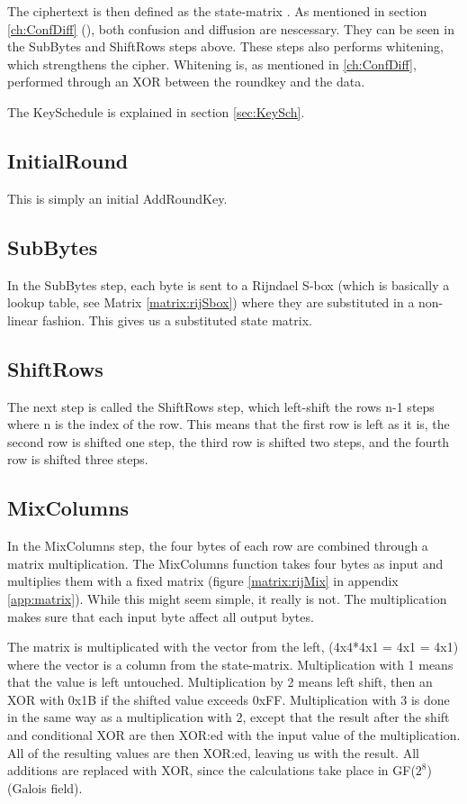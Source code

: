 The ciphertext is then defined as the state-matrix 
\citep[p. 103]{Stinson:2006}. As mentioned in section 
\ref{ch:ConfDiff} (), both confusion and diffusion 
are nescessary. They can be seen in the SubBytes and ShiftRows steps 
above. These steps also performs whitening, which strengthens the 
cipher. Whitening is, as mentioned in \ref{ch:ConfDiff}, performed 
through an XOR between the roundkey and the data.

The KeySchedule is explained in section \ref{sec:KeySch}.

\subsection{InitialRound}
This is simply an initial AddRoundKey.

\subsection{SubBytes}
In the SubBytes step, each byte is sent to a Rijndael S-box (which is 
basically a lookup table, see Matrix \ref{matrix:rijSbox}) where they 
are substituted in a non-linear fashion. This gives us a substituted 
state matrix.

\subsection{ShiftRows}
The next step is called the ShiftRows step, which left-shift the rows 
n-1 steps where n is the index of the row. This means that the first 
row is left as it is, the second row is shifted one step, the third row 
is shifted two steps, and the fourth row is shifted three steps.

\subsection{MixColumns}
In the MixColumns step, the four bytes of each row are combined through 
a matrix multiplication. The MixColumns function takes four bytes as 
input and multiplies them with a fixed matrix (figure 
\ref{matrix:rijMix} in appendix \ref{app:matrix}). While this might 
seem simple, it really is not. The multiplication makes sure that each 
input byte affect all output bytes.\citep{Angelfire}

The matrix is multiplicated with the vector from the left, (4x4*4x1 = 
4x1 = 4x1) where the vector is a column from the 
state-matrix. Multiplication with 1 means that the value is left 
untouched. Multiplication by 2 means left shift, then an XOR with 0x1B 
if the shifted value exceeds 0xFF. Multiplication with 3 is done in the 
same way as a multiplication with 2, except that the result after the 
shift and conditional XOR are then XOR:ed with the input value of the 
multiplication. All of the resulting values are then XOR:ed, leaving us 
with the result. All additions are replaced with XOR, since the 
calculations take place in GF(\(2^8\)) (Galois field).

